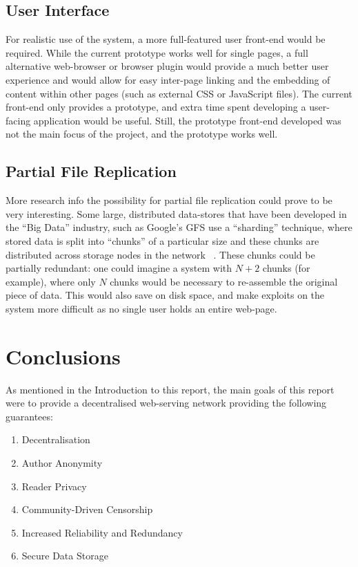\section{User Interface}

For realistic use of the system, a more full-featured user front-end would be required.
While the current prototype works well for single pages, a full alternative web-browser
or browser plugin would provide a much better user experience and would allow for easy
inter-page linking and the embedding of content within other pages (such as external
CSS or JavaScript files). The current front-end only provides a prototype, and extra
time spent developing a user-facing application would be useful. Still, the prototype
front-end developed was not the main focus of the project, and the prototype works
well.

\section{Partial File Replication}

More research info the possibility for partial file replication could prove to be
very interesting. Some large, distributed data-stores that have been developed in the
``Big Data'' industry, such as Google's GFS use a ``sharding'' technique, where stored data
is split into ``chunks'' of a particular size and these chunks are distributed across storage
nodes in the network ~\cite{gfs}. These chunks could be partially redundant: one could imagine a system with
$N+2$ chunks (for example), where only $N$ chunks would be necessary to re-assemble
the original piece of data. This would also save on disk space, and make exploits
on the system more difficult as no single user holds an entire web-page.

\chapter{Conclusions}

As mentioned in the Introduction to this report, the main goals of this report were
to provide a decentralised web-serving network providing the following guarantees:

\begin{enumerate}
    \item{Decentralisation}
    \item{Author Anonymity}
    \item{Reader Privacy}
    \item{Community-Driven Censorship}
    \item{Increased Reliability and Redundancy}
    \item{Secure Data Storage}
\end{enumerate}

